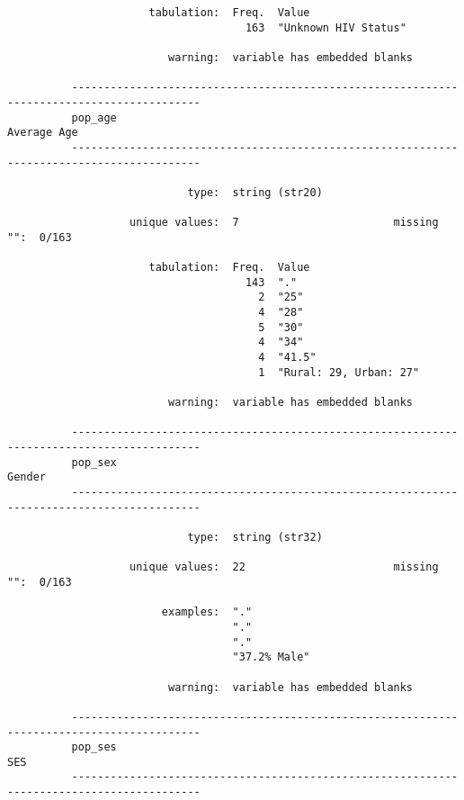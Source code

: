 \documentclass{article}
\begin{document}
\begin{verbatim}
                      tabulation:  Freq.  Value
                                     163  "Unknown HIV Status"
          
                         warning:  variable has embedded blanks
          
          ------------------------------------------------------------------------------------------
          pop_age                                                                        Average Age
          ------------------------------------------------------------------------------------------
          
                            type:  string (str20)
          
                   unique values:  7                        missing "":  0/163
          
                      tabulation:  Freq.  Value
                                     143  "."
                                       2  "25"
                                       4  "28"
                                       5  "30"
                                       4  "34"
                                       4  "41.5"
                                       1  "Rural: 29, Urban: 27"
          
                         warning:  variable has embedded blanks
          
          ------------------------------------------------------------------------------------------
          pop_sex                                                                             Gender
          ------------------------------------------------------------------------------------------
          
                            type:  string (str32)
          
                   unique values:  22                       missing "":  0/163
          
                        examples:  "."
                                   "."
                                   "."
                                   "37.2% Male"
          
                         warning:  variable has embedded blanks
          
          ------------------------------------------------------------------------------------------
          pop_ses                                                                                SES
          ------------------------------------------------------------------------------------------
          

\end{verbatim}
\end{document}
